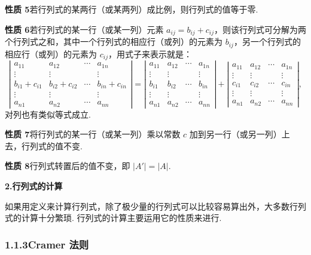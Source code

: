 \documentclass[UTF8, 12pt, fontset=fandol, oneside]{ctexart}
\begin{document}
\noindent\textbf{性质 5}\quad 若行列式的某两行（或某两列）成比例，则行列式的值等于零.

\noindent\textbf{性质 6}\quad 若行列式的某一行（或某一列）元素 $a_{ij}=b_{ij}+c_{ij}$，则该行列式可分解为两个行列式之和，其中一个行列式的相应行（或列）的元素为 $b_{ij}$，另一个行列式的相应行（或列）的元素为 $c_{ij}$，用式子来表示就是：
\[
\left|\begin{array}{ccccc}
a_{11} & a_{12} & \cdots & a_{1n}\\
\vdots & \vdots &        & \vdots\\
b_{i1}+c_{i1} & b_{i2}+c_{i2} & \cdots & b_{in}+c_{in}\\
\vdots & \vdots &        & \vdots\\
a_{n1} & a_{n2} & \cdots & a_{nn}
\end{array}\right|
=
\left|\begin{array}{ccccc}
a_{11} & a_{12} & \cdots & a_{1n}\\
\vdots & \vdots &        & \vdots\\
b_{i1} & b_{i2} & \cdots & b_{in}\\
\vdots & \vdots &        & \vdots\\
a_{n1} & a_{n2} & \cdots & a_{nn}
\end{array}\right|
+
\left|\begin{array}{ccccc}
a_{11} & a_{12} & \cdots & a_{1n}\\
\vdots & \vdots &        & \vdots\\
c_{i1} & c_{i2} & \cdots & c_{in}\\
\vdots & \vdots &        & \vdots\\
a_{n1} & a_{n2} & \cdots & a_{nn}
\end{array}\right|,
\]
对列也有类似等式成立.

\noindent\textbf{性质 7}\quad 将行列式的某一行（或某一列）乘以常数 $c$ 加到另一行（或另一列）上去，行列式的值不变.

\noindent\textbf{性质 8}\quad 行列式转置后的值不变，即 $|A'|=|A|$.

\noindent\textbf{2.\quad 行列式的计算}

如果用定义来计算行列式，除了极少量的行列式可以比较容易算出外，大多数行列式的计算十分繁琐. 行列式的计算主要运用它的性质来进行.

\subsubsection*{1.1.3\quad Cramer 法则}
\end{document}

